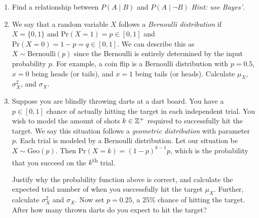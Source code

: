 \documentclass[main.tex]{subfiles}
\begin{document}
\begin{enumerate}
	\item
	Find a relationship between \(P(A \mid B)\) and \(P(A \mid \lnot B)\) \textit{Hint: use Bayes'}.
	
	\item We say that a random variable \(X\) follows a \textit{Bernoulli distribution} if \(X = \{0,1\}\) and \(\mathrm{Pr}(X = 1) = p \in [0,1]\) and \(\mathrm{Pr}(X = 0) = 1-p = q \in [0,1]\). We can describe this as \(X \sim \text{Bernoulli}(p)\) since the Bernoulli is entirely determined by the input probability \(p\). For example, a coin flip is a Bernoulli distribution with \(p=0.5\), \(x=0\) being heads (or tails), and \(x=1\) being tails (or heads). Calculate \(\mu_X\), \(\sigma_X^2\), and \(\sigma_X\).
	
	\item Suppose you are blindly throwing darts at a dart board. You have a \(p \in [0,1]\) chance of actually hitting the target in each independent trial. You wish to model the amount of shots \(k \in \mathbb{Z}^+\) required to successfully hit the target. We say this situation follows a \textit{geometric distribution} with parameter \(p\). Each trial is modeled by a Bernoulli distribution. Let our situation be \(X \sim \text{Geo}(p)\). Then \(\mathrm{Pr}(X = k) = (1-p)^{k-1}p\), which is the probability that you succeed on the \(k\)\textsuperscript{th} trial.
	
	Justify why the probability function above is correct, and calculate the expected trial number of when you successfully hit the target \(\mu_X\). Further, calculate \(\sigma_X^2\) and \(\sigma_X\). Now set \(p=0.25\), a \(25\%\) chance of hitting the target. After how many thrown darts do you expect to hit the target?
\end{enumerate}
\end{document}

